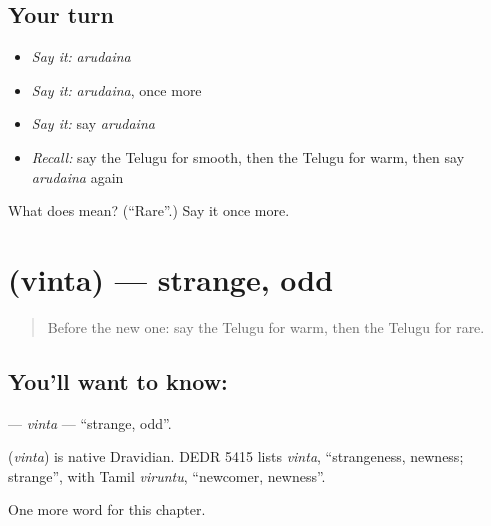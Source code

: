 \subsection*{Your turn}
\begin{itemize}
\raggedright
  \item \emph{Say it:} \emph{arudaina}
  \item \emph{Say it:} \emph{arudaina}, once more
  \item \emph{Say it:} say \emph{arudaina}
  \item \emph{Recall:} say the Telugu for smooth, then the Telugu for warm, then say \emph{arudaina} again
\end{itemize}

\begin{tcolorbox}[breakable,colback=teal!4,colframe=teal!35!black,title={Before you move on}]
What does  mean? (\textquotedblleft{}Rare\textquotedblright{}.) Say it once more.
\end{tcolorbox}
\section[\texorpdfstring{\te{వింత} (vinta)}{వింత (vinta)}]{ (vinta) — strange, odd}

\label{lesson:TE-C260-vinta}



\begin{quote}
Before the new one: say the Telugu for warm, then the Telugu for rare.
\end{quote}

\subsection*{You'll want to know: }
\textbf{} — \emph{vinta} — \textquotedblleft{}strange, odd\textquotedblright{}.

\begin{cousinweb}
\textbf{} (\emph{vinta}) is native Dravidian. DEDR 5415 lists \emph{vinta}, \textquotedblleft{}strangeness, newness; strange\textquotedblright{}, with Tamil \emph{viruntu}, \textquotedblleft{}newcomer, newness\textquotedblright{}.
\end{cousinweb}

\begin{grammarlens}[title={What you've built}]
One more word for this chapter.
\end{grammarlens}


